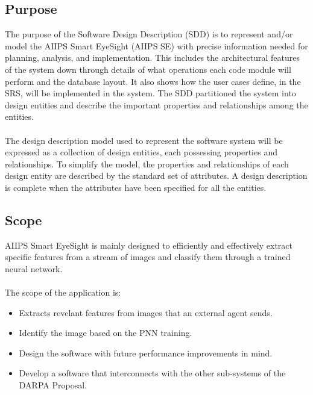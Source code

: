 \documentclass[12pt]{article}
\begin{document}
\subsection{Purpose}
The purpose of the Software Design Description (SDD) is to represent and/or model the AIIPS Smart EyeSight (AIIPS SE) with precise information needed for planning, analysis, and implementation. This includes the architectural features of the system down through details of what operations each code module will perform and the database layout. It also shows how the user cases define, in the SRS, will be implemented in the system. The SDD partitioned the system into design entities and describe the important properties and relationships among the entities.\\\\
The design description model used to represent the software system will be expressed as a collection of design entities, each possessing properties and relationships. To simplify the model, the properties and relationships of each design entity are described by the standard set of attributes. A design description is complete when the attributes have been specified for all the entities.
\subsection{Scope}

AIIPS Smart EyeSight is mainly designed to efficiently and effectively extract specific features from a stream of images and classify them through a trained neural network.\\\\
The scope of the application is: 
\begin{itemize}
  \item Extracts revelant features from images that an external agent sends.
  \item Identify the image based on the PNN training.
  \item Design the software with future performance improvements in mind.
  \item Develop a software that interconnects with the other sub-systems of the DARPA Proposal.
\end{itemize}
\end{document}
